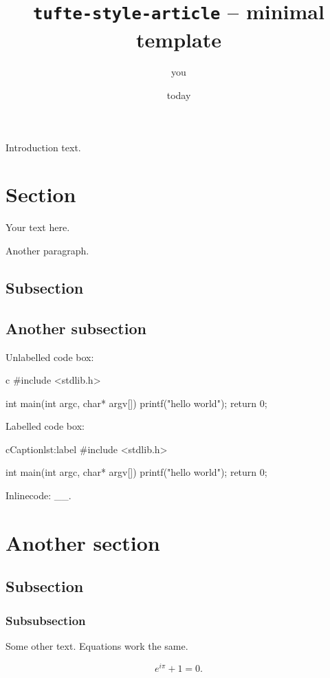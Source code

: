 \documentclass[
]{tufte-style-article}
\title{\texttt{tufte-style-article} -- minimal template}
\author{you}
\date{today}
\begin{document}
\maketitle

Introduction text.


\section{Section}

Your text here.

Another paragraph.

\subsection{Subsection}




\newpage

\subsection{Another subsection}

Unlabelled code box:

\begin{codebox}{c}
#include <stdlib.h>

int main(int argc, char* argv[]) {
    printf("hello world");
    return 0;
}
\end{codebox}

Labelled code box:

\begin{snippet}{c}{Caption}{lst:label}
#include <stdlib.h>

int main(int argc, char* argv[]) {
    printf("hello world");
    return 0;
}
\end{snippet}

Inlinecode: __.


\section{Another section}


\subsection{Subsection}


\subsubsection{Subsubsection}

Some other text. Equations work the same.

$$
e^{i\pi}+1 = 0.
$$
\end{document}
